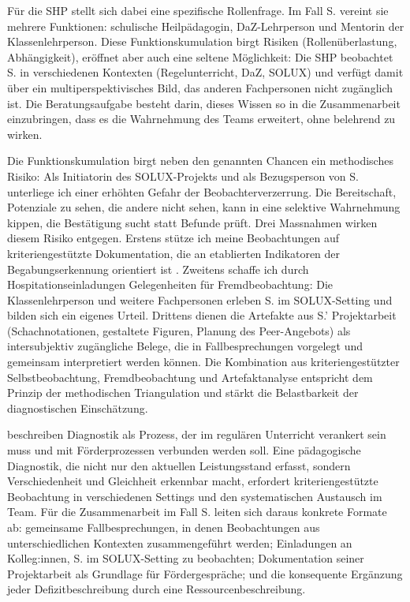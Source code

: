 \documentclass[ngerman, a4paper]{article}
\begin{document}
Für die SHP stellt sich dabei eine spezifische Rollenfrage. Im Fall S. vereint sie
mehrere Funktionen: schulische Heilpädagogin, DaZ-Lehrperson und Mentorin der
Klassenlehrperson. Diese Funktionskumulation birgt Risiken (Rollenüberlastung,
Abhängigkeit), eröffnet aber auch eine seltene Möglichkeit: Die SHP beobachtet S. in
verschiedenen Kontexten (Regelunterricht, DaZ, SOLUX) und verfügt damit über ein
multiperspektivisches Bild, das anderen Fachpersonen nicht zugänglich ist. Die
Beratungsaufgabe besteht darin, dieses Wissen so in die Zusammenarbeit einzubringen,
dass es die Wahrnehmung des Teams erweitert, ohne belehrend zu wirken.

Die Funktionskumulation birgt neben den genannten Chancen ein methodisches
Risiko: Als Initiatorin des SOLUX-Projekts und als Bezugsperson von S.
unterliege ich einer erhöhten Gefahr der Beobachterverzerrung. Die
Bereitschaft, Potenziale zu sehen, die andere nicht sehen, kann in eine
selektive Wahrnehmung kippen, die Bestätigung sucht statt Befunde prüft.
Drei Massnahmen wirken diesem Risiko entgegen. Erstens stütze ich meine
Beobachtungen auf kriteriengestützte Dokumentation, die an etablierten
Indikatoren der Begabungserkennung orientiert ist
\parencite{trautmann2016einfuehrung,ipege2009professionelle}. Zweitens
schaffe ich durch Hospitationseinladungen Gelegenheiten für
Fremdbeobachtung: Die Klassenlehrperson und weitere Fachpersonen
erleben S. im SOLUX-Setting und bilden sich ein eigenes Urteil. Drittens
dienen die Artefakte aus S.' Projektarbeit (Schachnotationen, gestaltete
Figuren, Planung des Peer-Angebots) als intersubjektiv zugängliche Belege,
die in Fallbesprechungen vorgelegt und gemeinsam interpretiert werden
können. Die Kombination aus kriteriengestützter Selbstbeobachtung,
Fremdbeobachtung und Artefaktanalyse entspricht dem Prinzip der
methodischen Triangulation und stärkt die Belastbarkeit der diagnostischen
Einschätzung.

\textcite{buholzer2010allegleich} beschreiben Diagnostik als Prozess, der im regulären
Unterricht verankert sein muss und mit Förderprozessen verbunden werden soll.
Eine pädagogische Diagnostik, die nicht nur den aktuellen Leistungsstand erfasst,
sondern Verschiedenheit und Gleichheit erkennbar macht, erfordert kriteriengestützte
Beobachtung in verschiedenen Settings und den systematischen Austausch im Team.
Für die Zusammenarbeit im Fall S. leiten sich daraus konkrete Formate ab:
gemeinsame Fallbesprechungen, in denen Beobachtungen aus unterschiedlichen
Kontexten zusammengeführt werden; Einladungen an Kolleg:innen, S. im SOLUX-Setting
zu beobachten; Dokumentation seiner Projektarbeit als Grundlage für Fördergespräche;
und die konsequente Ergänzung jeder Defizitbeschreibung durch eine Ressourcenbeschreibung.
\end{document}
